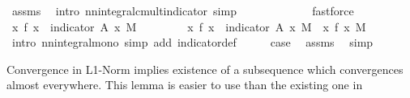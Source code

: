 \begin{isabellebody}
\ assms{\isacharparenleft}{\kern0pt}{}{\isacharparenright}{\kern0pt}\ \isamarkupfalse%
\ {\isacharparenleft}{\kern0pt}intro\ nn{\isacharunderscore}{\kern0pt}integral{\isacharunderscore}{\kern0pt}cmult{\isacharunderscore}{\kern0pt}indicator{\isacharcomma}{\kern0pt}\ simp{\isacharparenright}{\kern0pt}\isanewline
\ \ \isamarkupfalse%
\ \isamarkupfalse%
\ {\isachardoublequoteopen}{\isachardot}{\kern0pt}{\isachardot}{\kern0pt}{\isachardot}{\kern0pt}\ {\isacharequal}{\kern0pt}\ {\isasyminfinity}{\isachardoublequoteclose}\ \isamarkupfalse%
\ {\isacharasterisk}{\kern0pt}\ \isamarkupfalse%
\ fastforce\isanewline
\ \ \isamarkupfalse%
\ \isamarkupfalse%
\ {\isachardoublequoteopen}{\isacharparenleft}{\kern0pt}{\isasymintegral}\isactrlsup {\isacharplus}{\kern0pt}x{\isachardot}{\kern0pt}\ f\ x\ {\isacharasterisk}{\kern0pt}\ indicator\ {\isacharquery}{\kern0pt}A\ x\ {\isasympartial}M{\isacharparenright}{\kern0pt}\ {\isacharequal}{\kern0pt}\ {\isasyminfinity}{\isachardoublequoteclose}\ \isacommand{{\isachardot}{\kern0pt}}\isamarkupfalse%
\isanewline
\ \ \isamarkupfalse%
\ \isamarkupfalse%
\ {\isachardoublequoteopen}{\isacharparenleft}{\kern0pt}{\isasymintegral}\isactrlsup {\isacharplus}{\kern0pt}x{\isachardot}{\kern0pt}\ f\ x\ {\isacharasterisk}{\kern0pt}\ indicator\ {\isacharquery}{\kern0pt}A\ x\ {\isasympartial}M{\isacharparenright}{\kern0pt}\ {\isasymle}\ {\isacharparenleft}{\kern0pt}{\isasymintegral}\isactrlsup {\isacharplus}{\kern0pt}x{\isachardot}{\kern0pt}\ f\ x\ {\isasympartial}M{\isacharparenright}{\kern0pt}{\isachardoublequoteclose}\ \isamarkupfalse%
\ {\isacharparenleft}{\kern0pt}intro\ nn{\isacharunderscore}{\kern0pt}integral{\isacharunderscore}{\kern0pt}mono{\isacharcomma}{\kern0pt}\ simp\ add{\isacharcolon}{\kern0pt}\ indicator{\isacharunderscore}{\kern0pt}def{\isacharparenright}{\kern0pt}\isanewline
\ \ \isamarkupfalse%
\ \isamarkupfalse%
\ {\isacharquery}{\kern0pt}case\ \isamarkupfalse%
\ assms{\isacharparenleft}{\kern0pt}{}{\isacharparenright}{\kern0pt}\ \isamarkupfalse%
\ simp\isanewline
{}\isamarkupfalse%
%
\endisatagproof
{\isafoldproof}%
%
\isadelimproof
%
\endisadelimproof
%
\begin{isamarkuptext}%
Convergence in L1-Norm implies existence of a subsequence which convergences almost everywhere. This lemma is easier to use than the existing one in %

\end{isamarkuptext}
\end{isabellebody}
